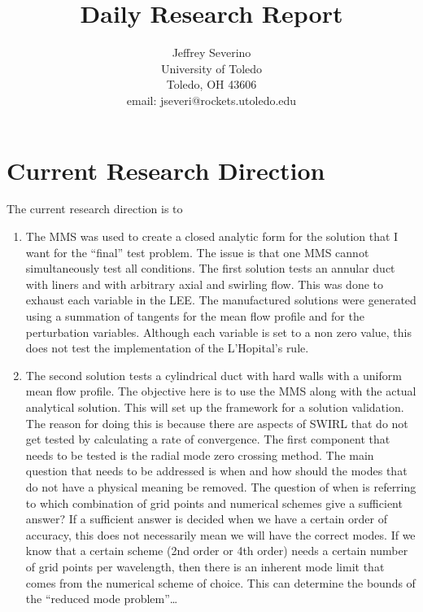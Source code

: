 \documentclass[a4paper]{article}
\begin{document}
\begin{titlepage}

    \title{
    Daily Research Report}

    \author{ Jeffrey Severino \\
        University of Toledo \\
        Toledo, OH  43606 \\
    email: jseveri@rockets.utoledo.edu}


    \maketitle

\end{titlepage}
\section{Current Research Direction}
The current research direction is to
\begin{enumerate}
    \item The MMS was used to create a closed analytic form for the solution
        that I want for the ``final'' test problem. The issue is that one MMS
        cannot simultaneously test all conditions.
\subitem The first solution tests an annular duct with liners and with arbitrary
axial and swirling flow. This was done to exhaust each variable in the LEE. The 
manufactured solutions were generated using a summation of tangents for the 
mean flow profile and for the perturbation variables. Although each variable
is set to a non zero value, this does not test the implementation of the L'Hopital's rule.
\item The second solution tests a cylindrical duct with hard walls with
    a uniform mean flow profile. The objective here is to use the MMS along 
    with the actual analytical solution. This will set up the framework for a 
    solution validation. The reason for doing this is because there are aspects 
    of SWIRL that do not get tested by calculating a rate of convergence. The first
    component that needs to be tested is the radial mode zero crossing method. 
\subitem The main question that needs to be addressed is when and how should the modes 
that do not have a physical meaning be removed. The question of when is referring 
to which combination of grid points and numerical schemes give a sufficient answer?
If a sufficient answer is decided when we have a certain order of accuracy, this 
does not necessarily mean we will have the correct modes. 
\subitem If we know that a certain scheme (2nd order or 4th order) needs a certain
number of grid points per wavelength, then there is an inherent mode limit that comes 
from the numerical scheme of choice. This can determine the bounds of the ``reduced mode
problem''\ldots 
\end{enumerate}
\end{document}
